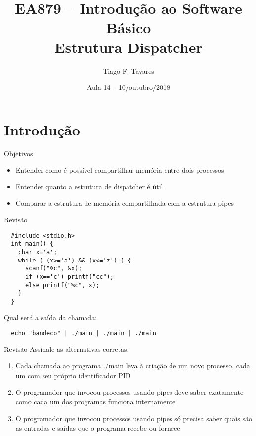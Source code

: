 \documentclass{beamer}
\title[14-memshare]{EA879 -- Introdução ao Software
Básico\\Estrutura Dispatcher}
\author{Tiago F. Tavares}
\institute{FEEC -- UNICAMP}
\date{Aula 14 -- 10/outubro/2018}
\begin{document}
\begin{frame}
  \titlepage
\end{frame}


\section{Introdução}

\begin{frame}{Objetivos}
  \Large
  \begin{itemize}
    \item Entender como é possível compartilhar memória entre dois processos
    \item Entender quanto a estrutura de dispatcher é útil
    \item Comparar a estrutura de memória compartilhada com a estrutura pipes
  \end{itemize}
\end{frame}


\begin{frame}[fragile]{Revisão}
  \centering
  \large
  \begin{verbatim}
  #include <stdio.h>
  int main() {
    char x='a';
    while ( (x>='a') && (x<='z') ) {
      scanf("%c", &x);
      if (x=='c') printf("cc");
      else printf("%c", x);
    }
  }
  \end{verbatim}

  Qual será a saída da chamada:
  \begin{verbatim}
  echo "bandeco" | ./main | ./main | ./main
  \end{verbatim}
\end{frame}


\begin{frame}[fragile]{Revisão}
  \centering
  \LARGE
  Assinale as alternativas corretas:
  \begin{enumerate}
    \item Cada chamada ao programa ./main leva à criação de um novo processo,
      cada um com seu próprio identificador PID
    \item O programador que invocou processos usando pipes deve saber exatamente
      como cada um dos programas funciona internamente
    \item O programador que invocou processos usando pipes só precisa saber
      quais são as entradas e saídas que o programa recebe ou fornece
  \end{enumerate}
\end{frame}
\end{document}
